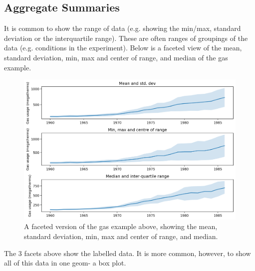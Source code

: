 \documentclass[a4paper, openany]{memoir}
\begin{document}
\subsection{Aggregate Summaries}
It is common to show the range of data (e.g. showing the min/max, standard deviation or the interquartile range). These are often ranges of groupings of the data (e.g. conditions in the experiment). Below is a faceted view of the mean, standard deviation, min, max and center of range, and median of the gas example.
\begin{figure}[H]
    \centering
    \includegraphics[scale=0.5]{src/2.32 Gas Example Plot 16.png}
    \caption{A faceted version of the gas example above, showing the mean, standard deviation, min, max and center of range, and median.}
\end{figure}
The 3 facets above show the labelled data. It is more common, however, to show all of this data in one geom- a box plot.
\end{document}
